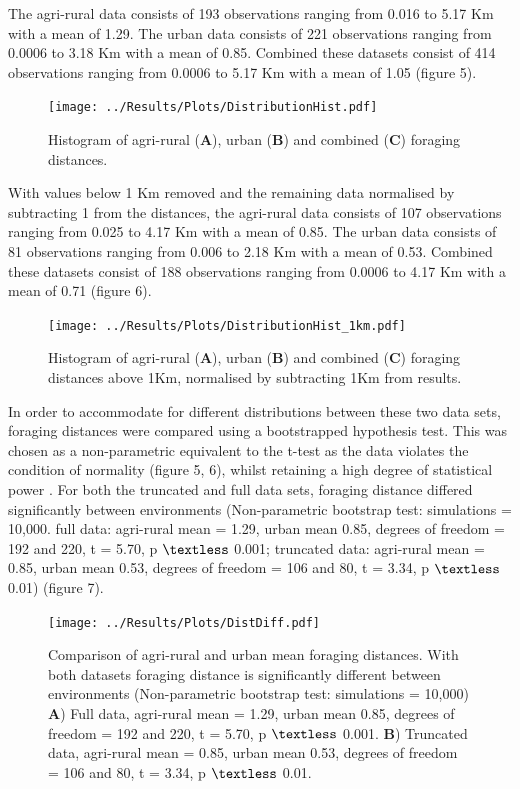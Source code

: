 \documentclass[11pt,usenames,dvipsnames,a4paper]{article}
\begin{document}
\begin{linenumbers}
\hspace{\parindent}
The agri-rural data consists of 193 observations ranging from 0.016 to 5.17 Km with a mean of 1.29. The urban data consists of 221 observations ranging from 0.0006 to 3.18 Km with a mean of 0.85. Combined these datasets consist of 414 observations ranging from 0.0006 to 5.17 Km with a mean of 1.05 (figure 5).
\end{linenumbers}

\begin{figure}[H]
	\centering
	\texttt{[image: ../Results/Plots/DistributionHist.pdf]}
	\caption{Histogram of agri-rural (\textbf{A}), urban (\textbf{B}) and combined (\textbf{C}) foraging distances.}
\end{figure}
\begin{linenumbers}

With values below 1 Km removed and the remaining data normalised by subtracting 1 from the distances, the agri-rural data consists of 107 observations ranging from 0.025 to 4.17 Km with a mean of 0.85. The urban data consists of 81 observations ranging from 0.006 to 2.18 Km with a mean of 0.53. Combined these datasets consist of 188 observations ranging from 0.0006 to 4.17 Km with a mean of 0.71 (figure 6).
\end{linenumbers}
\begin{figure}[H]
	\centering
	\texttt{[image: ../Results/Plots/DistributionHist\_1km.pdf]}
	\caption{Histogram of agri-rural (\textbf{A}), urban (\textbf{B}) and combined (\textbf{C}) foraging distances above 1Km, normalised by subtracting 1Km from results.}
\end{figure}
\begin{linenumbers}

In order to accommodate for different distributions between these two data sets, foraging distances were compared using a bootstrapped hypothesis test. This was chosen as a non-parametric equivalent to the t-test as the data violates the condition of normality (figure 5, 6), whilst retaining a high degree of statistical power \citep{Johnson2001}. For both the truncated and full data sets, foraging distance differed significantly between environments (Non-parametric bootstrap test: simulations = 10,000. full data: agri-rural mean = 1.29, urban mean 0.85, degrees of freedom = 192 and 220, t = 5.70, p $\textless$ 0.001; truncated data: agri-rural mean = 0.85, urban mean 0.53, degrees of freedom = 106 and 80, t = 3.34, p $\textless$ 0.01) (figure 7). 
\end{linenumbers}
\begin{figure}[H]
	\centering
	\texttt{[image: ../Results/Plots/DistDiff.pdf]}
	\caption{Comparison of agri-rural and urban mean foraging distances. With both datasets foraging distance is significantly different between environments (Non-parametric bootstrap test: simulations = 10,000) \textbf{A}) Full data, agri-rural mean = 1.29, urban mean 0.85, degrees of freedom = 192 and 220, t = 5.70, p $\textless$ 0.001. \textbf{B}) Truncated data, agri-rural mean = 0.85, urban mean 0.53, degrees of freedom = 106 and 80, t = 3.34, p $\textless$ 0.01.}
\end{figure}
\end{document}

